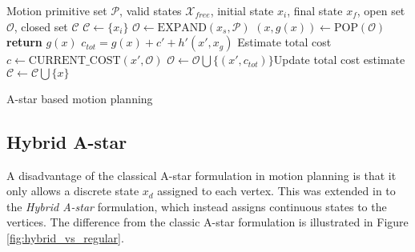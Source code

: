 \begin{algorithm}
    \begin{algorithmic}
        \Require Motion primitive set $\mathcal{P}$, valid states $\mathcal{X}_{free}$, initial state $x_i$, final state $x_f$, open set $\mathcal{O}$, closed set $\mathcal{C}$
            \State $\mathcal{C}\gets \{x_i\}$
            \State $\mathcal{O}\gets\text{EXPAND}(x_s, \mathcal{P})$
                \State $(x,g(x))\gets \text{POP}(\mathcal{O})$
                 
                    \State \textbf{return} $g(x)$
                \EndIf
                        \State $c_{tot}=g(x) + c' + h'(x', x_{g})$ \Comment Estimate total cost
                        \State $c\gets\text{CURRENT\_COST}(x', \mathcal{O})$
                            \State $\mathcal{O}\gets\mathcal{O}\bigcup\{(x',c_{tot})\}$\Comment Update total cost estimate
                        \EndIf
                    \EndIf
                \EndFor
            \State $\mathcal{C}\gets\mathcal{C}\bigcup \{x\}$
            \EndWhile
        \end{algorithmic}
        \caption{A-star based motion planning}
        \label{alg:astar}
\end{algorithm}

\subsection{Hybrid A-star}
A disadvantage of the classical A-star formulation in motion planning is that it only allows a discrete 
state $x_d$ assigned to each vertex. This was extended in \cite{hybrid_astar} to the \textit{Hybrid A-star} formulation,
which instead assigns continuous states to the vertices. The difference from the classic A-star formulation is illustrated in 
Figure \ref{fig:hybrid_vs_regular}.

